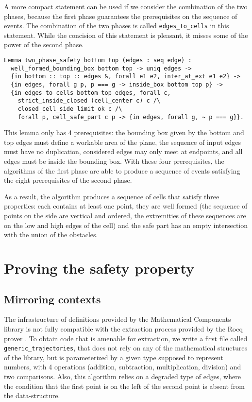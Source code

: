 \documentclass[a4paper, USenglish, cleveref, autoref, thm-restate, final]{lipics-v2021}
\begin{document}
A more compact statement can be used if we consider the combination of the
two phases, because the first phase guarantees the prerequisites on the
sequence of events.  The combination of the two phases is called
{\tt edges\_to\_cells} in this statement.
While the concision of this statement is pleasant, it
misses some of the power of the second phase.
\begin{verbatim}
Lemma two_phase_safety bottom top (edges : seq edge) :
  well_formed_bounding_box bottom top -> uniq edges ->
  {in bottom :: top :: edges &, forall e1 e2, inter_at_ext e1 e2} ->
  {in edges, forall g p, p === g -> inside_box bottom top p} ->
  {in edges_to_cells bottom top edges, forall c,
    strict_inside_closed (cell_center c) c /\
    closed_cell_side_limit_ok c /\
    forall p, cell_safe_part c p -> {in edges, forall g, ~ p === g}}.
\end{verbatim}
This lemma only has 4 prerequisites: the bounding box given by the
bottom and top edges must define a workable area of the plane, the sequence
of input edges must have no duplication, considered edges may only
meet at endpoints, and all edges must be inside the bounding box.  With these
four prerequisites, the algorithms of the first phase are able to produce
a sequence of events satisfying the eight prerequisites of the second phase.

As a result, the algorithm produces a sequence of cells that satisfy three
properties: each contains at least one point, they are well formed (the 
sequence of points on the side are vertical and ordered, the extremities of
these sequences are on the low and high edges of the cell) and the safe
part has an empty intersection with the union of the obstacles.

\section{Proving the safety property}
\subsection{Mirroring contexts}
The infrastructure of definitions provided by the {\sc Mathematical
Components} library is not fully compatible with the extraction
process provided by the Rocq prover \cite{letouzey:hal-00150914}.
To obtain code that is amenable for extraction, we write a
first file called {\tt generic\_trajectories}, that does not rely on
any of the mathematical structures of the library, but is
parameterized by a given type supposed to represent numbers, with 4
operations (addition, subtraction, multiplication, division) and two
comparisons.  Also, this algorithm relies on a degraded type of edges,
where the condition that the first point is on the left of the second
point is absent from the data-structure.
\end{document}
